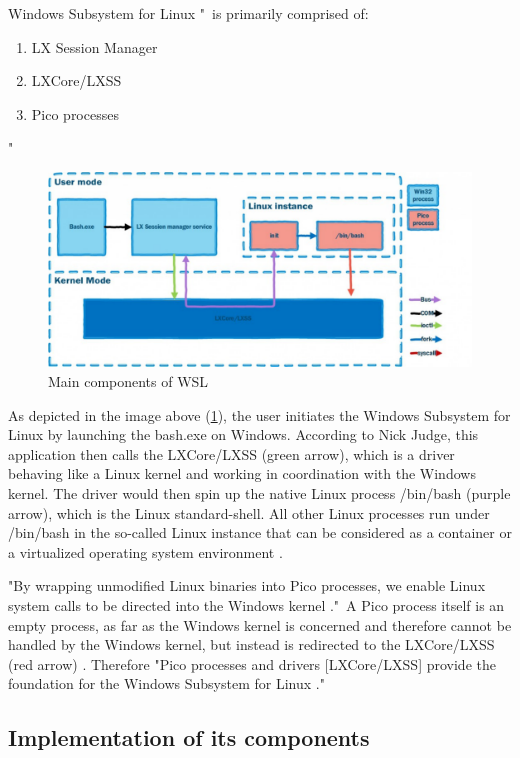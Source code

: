 \documentclass[utf8,biblatex, ngerman, english]{lni}
\begin{document}
Windows Subsystem for Linux "\ is primarily comprised of: 
\begin{enumerate}
    \item LX Session Manager
    \item LXCore/LXSS
    \item Pico processes
\end{enumerate} \cite{Ha16b}"

\begin{figure}
  \centering
  \includegraphics[width=1\textwidth]{WSL Architecture.pdf}
  \caption{Main components of WSL \cite{Ha16b}}
  \label{img:architecture}
\end{figure}

As depicted in the image above (\ref{img:architecture}), the user initiates the Windows Subsystem for Linux by launching the bash.exe on Windows. According to Nick Judge, this application then calls the LXCore/LXSS (green arrow), which is a driver behaving like a Linux kernel and working in coordination with the Windows kernel. The driver would then spin up the native Linux process /bin/bash (purple arrow), which is the Linux standard-shell. All other Linux processes run under /bin/bash in the so-called Linux instance that can be considered as a container or a virtualized operating system environment \cite{Ha16a}.

"By wrapping unmodified Linux binaries into Pico processes, we enable Linux system calls to be directed into the Windows kernel \cite{Ha16b}."\ A Pico process itself is an empty process, as far as the Windows kernel is concerned and therefore cannot be handled by the Windows kernel, but instead is redirected to the LXCore/LXSS (red arrow) \cite{Ha16a}.
Therefore "Pico processes and drivers [LXCore/LXSS] provide the foundation for the Windows Subsystem for Linux \cite{Ha16b}."

\subsection{Implementation of its components}
\end{document}
